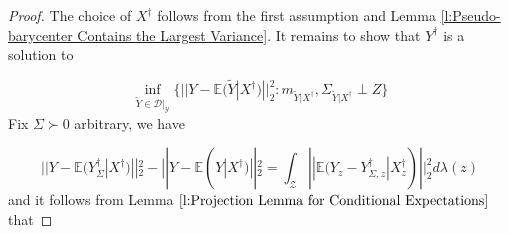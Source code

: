 \documentclass[twoside,11pt]{article}
\begin{document}
\begin{proof}
The choice of $X^{\dag}$ follows from the first assumption and Lemma \ref{l:Pseudo-barycenter Contains the Largest Variance}. It remains to show that $Y^{\dag}$ is a solution to

\begin{equation}
\inf_{\tilde{Y} \in \mathcal{D}|_{\mathcal{Y}}}  \{ ||Y - \mathbb{E}(\tilde{Y}|X^{\dag})||^2_2: m_{\tilde{Y}|X^{\dag}}, \Sigma_{\tilde{Y}|X^{\dag}} \perp Z\}
\end{equation}
Fix $\Sigma \succ 0$ arbitrary, we have

\begin{equation}
||Y - \mathbb{E}(Y^{\dag}_{\Sigma}|X^{\dag})||^2_2 - ||Y - \mathbb{E}(Y|X^{\dag})||^2_2 = \int_{\mathcal{Z}} ||\mathbb{E}(Y_z - Y^{\dag}_{\Sigma,z} | X^{\dag}_z)||^2_2 d\lambda(z)
\end{equation}
and it follows from Lemma $\ref{l:Projection Lemma for Conditional Expectations}$ that


\end{proof}
\end{document}
